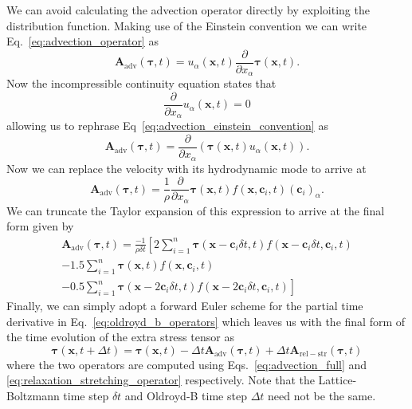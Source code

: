 We can avoid calculating the advection operator directly by exploiting the distribution function. Making use of the Einstein convention we can write Eq.~\eqref{eq:advection_operator} as
\begin{equation}\label{eq:advection_einstein_convention}
\bm{A}_{\mathrm{adv}}(\bm{\tau},t) = u_\alpha(\bm{x},t)\frac{\partial}{\partial x_\alpha} \bm{\tau}(\bm{x},t).
\end{equation}
Now the incompressible continuity equation states that
\begin{equation}\label{eq:continuity_einstein_convention}
\frac{\partial}{\partial x_\alpha} u_\alpha(\bm{x},t) = 0
\end{equation}
allowing us to rephrase Eq~\eqref{eq:advection_einstein_convention} as
\begin{equation}\label{eq:advection_intermediary}
\bm{A}_{\mathrm{adv}}(\bm{\tau},t) = \frac{\partial}{\partial x_\alpha}(\bm{\tau}(\bm{x},t)u_\alpha(\bm{x},t)).
\end{equation}
Now we can replace the velocity with its hydrodynamic mode to arrive at
\begin{equation}
\bm{A}_{\mathrm{adv}}(\bm{\tau},t) = \frac{1}{\rho} \frac{\partial}{\partial x_\alpha} \bm{\tau}(\bm{x},t)f(\bm{x},\bm{c}_i,t)(\bm{c}_i)_\alpha.
\end{equation}
We can truncate the Taylor expansion of this expression to arrive at the final form given by
\begin{multline}\label{eq:advection_full}
\bm{A}_{\mathrm{adv}}(\bm{\tau},t) = \frac{-1}{\rho \delta t}\left[2 \sum_{i=1}^n\bm{\tau}(\bm{x}-\bm{c}_i\delta t,t)f(\bm{x} - \bm{c}_i\delta t, \bm{c}_i,t)\right. \\
-1.5\sum_{i=1}^n\bm{\tau}(\bm{x},t)f(\bm{x}, \bm{c}_i,t) \\
\left.-0.5 \sum_{i=1}^n\bm{\tau}(\bm{x}-2\bm{c}_i\delta t,t)f(\bm{x} - 2\bm{c}_i\delta t, \bm{c}_i,t)\right]
\end{multline}
Finally, we can simply adopt a forward Euler scheme for the partial time derivative in Eq.~\eqref{eq:oldroyd_b_operators} which leaves us with the final form of the time evolution of the extra stress tensor as
\begin{equation}\label{eq:oldroyd_time_evolution}
\bm{\tau}(\bm{x},t+\Delta t) = \bm{\tau}(\bm{x},t) - \Delta t \bm{A}_{\mathrm{adv}}(\bm{\tau},t) + \Delta t \bm{A}_{\mathrm{rel-str}}(\bm{\tau},t)
\end{equation}
where the two operators are computed using Eqs.~\eqref{eq:advection_full} and \eqref{eq:relaxation_stretching_operator} respectively. Note that the Lattice-Boltzmann time step $\delta t$ and Oldroyd-B time step $\Delta t$ need not be the same.

